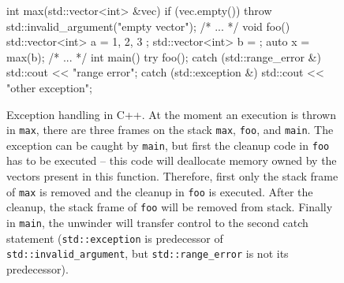\begin{figure}[t]
  \begin{cppcode}
    int max(std::vector<int> &vec) {
        if (vec.empty())
            throw std::invalid_argument("empty vector");
        /* ... */
    }
    void foo() {
        std::vector<int> a = { 1, 2, 3 };
        std::vector<int> b = {};
        auto x = max(b);
        /* ... */
    }
    int main() {
        try {
            foo();
        } catch (std::range_error &) {
            std::cout << "range error\n";
        } catch (std::exception &) {
            std::cout << "other exception\n";
        }
    }
  \end{cppcode}
\caption{Exception handling in C++.
  At the moment an execution is thrown in \texttt{max}, there are three frames
  on the stack \texttt{max}, \texttt{foo}, and \texttt{main}.
  The exception can be caught by \texttt{main}, but first the cleanup code
  in \texttt{foo} has to be executed -- this code will deallocate memory owned
  by the vectors present in this function.
  Therefore, first only the stack frame of \texttt{max} is removed and the
  cleanup in \texttt{foo} is executed.
  After the cleanup, the stack frame of \texttt{foo} will be removed from
  stack.
  Finally in \texttt{main}, the unwinder will transfer control to the second
  catch statement (\texttt{std::exception} is predecessor of \texttt{std::invalid\_argument}, but \texttt{std::range\_error} is not its predecessor).
}\label{fig:lang:exceptcpp}
\end{figure}

